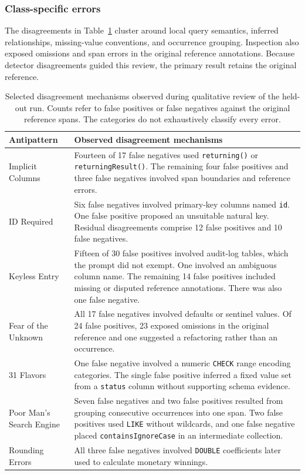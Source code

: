 \subsubsection{Class-specific errors}\label{sec:detectionErrors}

The disagreements in Table~\ref{tab:detectionErrors} cluster around local query semantics, inferred relationships, missing-value conventions, and occurrence grouping. Inspection also exposed omissions and span errors in the original reference annotations. Because detector disagreements guided this review, the primary result retains the original reference.

\begin{table}[H]
    \centering
    \small
    \caption{Selected disagreement mechanisms observed during qualitative review of the held-out run. Counts refer to false positives or false negatives against the original reference spans. The categories do not exhaustively classify every error.}
    \label{tab:detectionErrors}
    \begin{tabular}{p{2.9cm}p{7.8cm}}
        \hline
        \textbf{Antipattern} & \textbf{Observed disagreement mechanisms} \\
        \hline
        Implicit Columns & Fourteen of \num{17} false negatives used \texttt{returning()} or \texttt{returningResult()}. The remaining four false positives and three false negatives involved span boundaries and reference errors. \\
        ID Required & Six false negatives involved primary-key columns named \texttt{id}. One false positive proposed an unsuitable natural key. Residual disagreements comprise \num{12} false positives and \num{10} false negatives. \\
        Keyless Entry & Fifteen of \num{30} false positives involved audit-log tables, which the prompt did not exempt. One involved an ambiguous column name. The remaining \num{14} false positives included missing or disputed reference annotations. There was also one false negative. \\
        Fear of the Unknown & All \num{17} false negatives involved defaults or sentinel values. Of \num{24} false positives, \num{23} exposed omissions in the original reference and one suggested a refactoring rather than an occurrence. \\
        31 Flavors & One false negative involved a numeric \texttt{CHECK} range encoding categories. The single false positive inferred a fixed value set from a \texttt{status} column without supporting schema evidence. \\
        Poor Man's Search Engine & Seven false negatives and two false positives resulted from grouping consecutive occurrences into one span. Two false positives used \texttt{LIKE} without wildcards, and one false negative placed \texttt{containsIgnoreCase} in an intermediate collection. \\
        Rounding Errors & All three false negatives involved \texttt{DOUBLE} coefficients later used to calculate monetary winnings. \\
        \hline
    \end{tabular}
\end{table}

